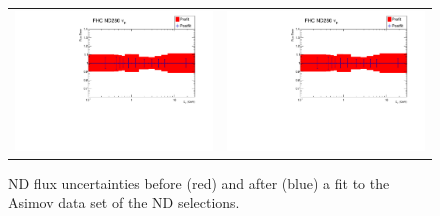 \begin{figure}[ht]
\begin{center}
\begin{adjustbox}{center}
\begin{tabular}{cc}
        \includegraphics[width=\imagewidth\textwidth,page=7]{images/BANFF/flux_asimov.pdf} & \includegraphics[width=\imagewidth\textwidth,page=8]{images/BANFF/flux_asimov.pdf}\\
      \end{tabular}
    \end{adjustbox}
    \caption[ND280 flux uncertainties before and after a fit to the
    Asimov data set of the ND280 selections]{\Gls{ND} flux
      uncertainties before (red) and after (blue) a fit to the
      \Gls{Asimov} data set of the \Gls{ND} selections.}
    \label{fig:asimovfluxND}
  \end{center}
\end{figure}

